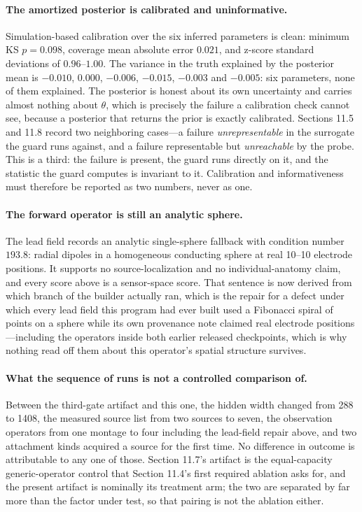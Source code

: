 \paragraph{The amortized posterior is calibrated and uninformative.}
Simulation-based calibration over the six inferred parameters is clean: minimum
KS \(p=0.098\), coverage mean absolute error \(0.021\), and z-score standard
deviations of \(0.96\)--\(1.00\). The variance in the truth explained by the
posterior mean is \(-0.010\), \(0.000\), \(-0.006\), \(-0.015\), \(-0.003\) and
\(-0.005\): six parameters, none of them explained. The posterior is honest about
its own uncertainty and carries almost nothing about \(\theta\), which is
precisely the failure a calibration check cannot see, because a posterior that
returns the prior is exactly calibrated. Sections 11.5 and 11.8 record two
neighboring cases---a failure \emph{unrepresentable} in the surrogate the guard
runs against, and a failure representable but \emph{unreachable} by the probe.
This is a third: the failure is present, the guard runs directly on it, and the
statistic the guard computes is invariant to it. Calibration and informativeness
must therefore be reported as two numbers, never as one.

\paragraph{The forward operator is still an analytic sphere.}
The lead field records an analytic single-sphere fallback with condition number
\(193.8\): radial dipoles in a homogeneous conducting sphere at real 10--10
electrode positions. It supports no source-localization and no
individual-anatomy claim, and every score above is a sensor-space score. That
sentence is now derived from which branch of the builder actually ran, which is
the repair for a defect under which every lead field this program had ever built
used a Fibonacci spiral of points on a sphere while its own provenance note
claimed real electrode positions---including the operators inside both earlier
released checkpoints, which is why nothing read off them about this operator's
spatial structure survives.

\paragraph{What the sequence of runs is not a controlled comparison of.}
Between the third-gate artifact and this one, the hidden width changed from 288
to 1408, the measured source list from two sources to seven, the observation
operators from one montage to four including the lead-field repair above, and two
attachment kinds acquired a source for the first time. No difference in outcome
is attributable to any one of those. Section 11.7's artifact is the
equal-capacity generic-operator control that Section 11.4's first required
ablation asks for, and the present artifact is nominally its treatment arm; the
two are separated by far more than the factor under test, so that pairing is not
the ablation either.


